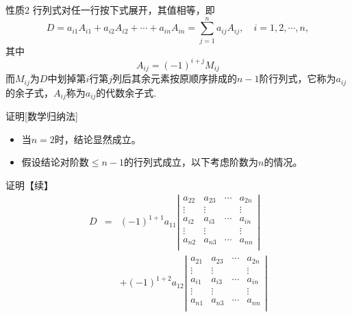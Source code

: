 \begin{frame}
  \begin{block}{性质2}
    行列式对任一行按下式展开，其值相等，即
    $$
    D = a_{i1} A_{i1} + a_{i2} A_{i2} + \cdots + a_{in}A_{in} = \sum_{j=1}^n a_{ij} A_{ij}, \quad
    i = 1, 2, \cdots, n,
    $$
    其中
    $$
    A_{ij} = (-1)^{i+j} M_{ij}
    $$
    而$M_{ij}$为$D$中划掉第$i$行第$j$列后其余元素按原顺序排成的$n-1$阶行列式，它称为$a_{ij}$的余子式，$A_{ij}$称为$a_{ij}$的代数余子式.
  \end{block}
\end{frame}


\begin{frame}
  \begin{block}{证明[数学归纳法]}
    \begin{itemize}
    \item 当$n=2$时，结论显然成立。
    \item 假设结论对阶数$\le n-1$的行列式成立，以下考虑阶数为$n$的情况。
    \end{itemize}
  \end{block}
\end{frame}


\begin{frame}
  \begin{block}{证明【续】}
    $$
    \begin{array}{rcl}
      D &=&  (-1)^{1+1} a_{11} \left|
      \begin{array}{cccc}
        a_{22}  & a_{23}   & \cdots & a_{2n}\\
        \vdots  & \vdots & & \vdots \\
        a_{i2}  & a_{i3}   & \cdots & a_{in}\\
        \vdots & \vdots  & & \vdots \\
        a_{n2}  & a_{n3}   & \cdots & a_{nn}\\
      \end{array}
      \right| \\[0.4in]
      &&+ (-1)^{1+2} a_{12} \left|
      \begin{array}{cccc}
        a_{21}  & a_{23}  & \cdots & a_{2n}\\
        \vdots & \vdots & & \vdots \\
        a_{i1}  & a_{i3}  & \cdots & a_{in}\\
        \vdots & \vdots & & \vdots \\
        a_{n1}  & a_{n3}  & \cdots & a_{nn}\\
      \end{array}
      \right|
    \end{array}
    $$
  \end{block}
\end{frame}


